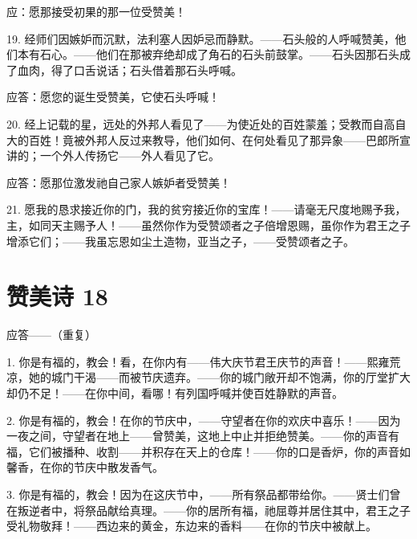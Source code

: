 应：愿那接受初果的那一位受赞美！\par

19. 经师们因嫉妒而沉默，法利塞人因妒忌而静默。——石头般的人呼喊赞美，他们本有石心。——他们在那被弃绝却成了角石的石头前鼓掌。——石头因那石头成了血肉，得了口舌说话；石头借着那石头呼喊。\par

应答：愿您的诞生受赞美，它使石头呼喊！\par

20. 经上记载的星，远处的外邦人看见了——为使近处的百姓蒙羞；受教而自高自大的百姓！竟被外邦人反过来教导，他们如何、在何处看见了那异象——巴郎所宣讲的；一个外人传扬它——外人看见了它。\par

应答：愿那位激发祂自己家人嫉妒者受赞美！\par

21. 愿我的恳求接近你的门，我的贫穷接近你的宝库！——请毫无尺度地赐予我，主，如同天主赐予人！——虽然你作为受赞颂者之子倍增恩赐，虽你作为君王之子增添它们；——我虽忘恩如尘土造物，亚当之子，——受赞颂者之子。\par

\par


\section{赞美诗 18}

应答——（重复）\par

1. 你是有福的，教会！看，在你内有——伟大庆节君王庆节的声音！——熙雍荒凉，她的城门干渴——而被节庆遗弃。——你的城门敞开却不饱满，你的厅堂扩大却仍不足！——在你中间，看哪！有列国呼喊并使百姓静默的声音。\par

2. 你是有福的，教会！在你的节庆中，——守望者在你的欢庆中喜乐！——因为一夜之间，守望者在地上——曾赞美，这地上中止并拒绝赞美。——你的声音有福，它们被播种、收割——并积存在天上的仓库！——你的口是香炉，你的声音如馨香，在你的节庆中散发香气。\par

3. 你是有福的，教会！因为在这庆节中，——所有祭品都带给你。——贤士们曾在叛逆者中，将祭品献给真理。——你的居所有福，祂屈尊并居住其中，君王之子受礼物敬拜！——西边来的黄金，东边来的香料——在你的节庆中被献上。\par


